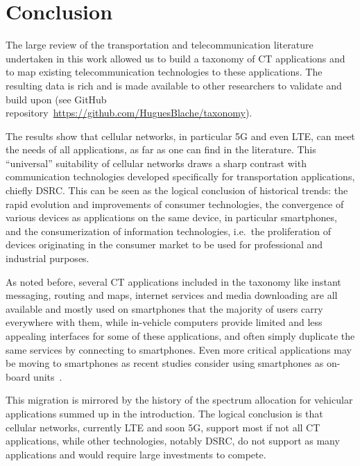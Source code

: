 \section{Conclusion}\label{sec:conclusion}
The large review of the transportation and telecommunication literature undertaken in this work allowed us to build a taxonomy of \acrshort{CT} applications and to map existing telecommunication technologies to these applications. The resulting data is rich and is made available to other researchers to validate and build upon (see GitHub repository~\url{https://github.com/HuguesBlache/taxonomy}).

The results show that cellular networks, in particular 5G and even LTE, can meet the needs of all applications, as far as one can find in the literature. This ``universal'' suitability of cellular networks draws a sharp contrast with communication technologies developed specifically for transportation applications, chiefly \acrshort{DSRC}. This can be seen as the logical conclusion of historical trends: the rapid evolution and improvements of consumer technologies, the convergence of various devices as applications on the same device, in particular smartphones, and the consumerization of information technologies, i.e.\ the proliferation of devices originating in the consumer market to be used for professional and industrial purposes. 

As noted before, several \acrshort{CT} applications included in the taxonomy like instant messaging, routing and maps, internet services and media downloading are all available and mostly used on smartphones that the majority of users carry everywhere with them, while in-vehicle computers provide limited and less appealing interfaces for some of these applications, and often simply duplicate the same services by connecting to smartphones. Even more critical applications may be moving to smartphones as recent studies consider using smartphones as on-board units~\cite{abdel-aty_using_2020}. 

This migration is mirrored by the history of the spectrum allocation for vehicular applications summed up in the introduction. The logical conclusion is that cellular networks, currently LTE and soon 5G, support most if not all \acrshort{CT} applications, while other technologies, notably DSRC, do not support as many applications and would require large investments to compete. 

